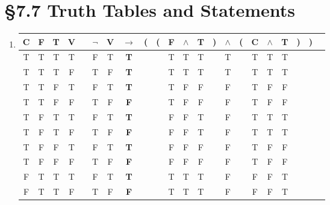 % 
% 

\section{\S 7.7 Truth Tables and Statements}
\begin{enumerate}
	\item \begin{tabular}{@{ }c@{ }@{ }c@{ }@{ }c@{ }@{ }c | c@{ }@{ }c@{ }@{ }c@{ }@{ }c@{ }@{}c@{}@{}c@{}@{ }c@{ }@{ }c@{ }@{ }c@{ }@{}c@{}@{ }c@{ }@{}c@{}@{ }c@{ }@{ }c@{ }@{ }c@{ }@{}c@{}@{}c@{}@{ }c}
		      C & F & T & V &  & $\lnot$ & V & $\rightarrow$ & ( & ( & F & $\land$ & T & ) & $\land$ & ( & C & $\land$ & T & ) & ) & \\
		      \hline
		      T & T & T & T &  & F       & T & \textbf{T}    &   &   & T & T       & T &   & T       &   & T & T       & T &   &   & \\
		      T & T & T & F &  & T       & F & \textbf{T}    &   &   & T & T       & T &   & T       &   & T & T       & T &   &   & \\
		      T & T & F & T &  & F       & T & \textbf{T}    &   &   & T & F       & F &   & F       &   & T & F       & F &   &   & \\
		      T & T & F & F &  & T       & F & \textbf{F}    &   &   & T & F       & F &   & F       &   & T & F       & F &   &   & \\
		      T & F & T & T &  & F       & T & \textbf{T}    &   &   & F & F       & T &   & F       &   & T & T       & T &   &   & \\
		      T & F & T & F &  & T       & F & \textbf{F}    &   &   & F & F       & T &   & F       &   & T & T       & T &   &   & \\
		      T & F & F & T &  & F       & T & \textbf{T}    &   &   & F & F       & F &   & F       &   & T & F       & F &   &   & \\
		      T & F & F & F &  & T       & F & \textbf{F}    &   &   & F & F       & F &   & F       &   & T & F       & F &   &   & \\
		      F & T & T & T &  & F       & T & \textbf{T}    &   &   & T & T       & T &   & F       &   & F & F       & T &   &   & \\
		      F & T & T & F &  & T       & F & \textbf{F}    &   &   & T & T       & T &   & F       &   & F & F       & T &   &   & \\

\end{tabular}
\end{enumerate}
